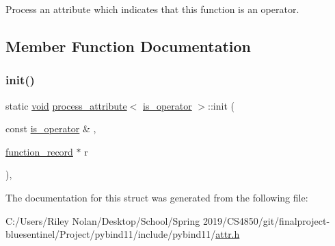 Process an attribute which indicates that this function is an operator. 

\subsection{Member Function Documentation}
\mbox{\label{structprocess__attribute_3_01is__operator_01_4_a4059c8aba2371dd6b8d05c49bc1624f5}} 
\subsubsection{\texorpdfstring{init()}{init()}}
{\footnotesize\ttfamily static \mbox{\hyperlink{_s_d_l__opengles2__gl2ext_8h_ae5d8fa23ad07c48bb609509eae494c95}{void}} \mbox{\hyperlink{structprocess__attribute}{process\+\_\+attribute}}$<$ \mbox{\hyperlink{structis__operator}{is\+\_\+operator}} $>$\+::init (\begin{DoxyParamCaption}\item[{const \mbox{\hyperlink{structis__operator}{is\+\_\+operator}} \&}]{,  }\item[{\mbox{\hyperlink{structfunction__record}{function\+\_\+record}} $\ast$}]{r }\end{DoxyParamCaption})\hspace{0.3cm}{\ttfamily [inline]}, {\ttfamily [static]}}



The documentation for this struct was generated from the following file\+:\begin{DoxyCompactItemize}
\item 
C\+:/\+Users/\+Riley Nolan/\+Desktop/\+School/\+Spring 2019/\+C\+S4850/git/finalproject-\/bluesentinel/\+Project/pybind11/include/pybind11/\mbox{\hyperlink{attr_8h}{attr.\+h}}\end{DoxyCompactItemize}
